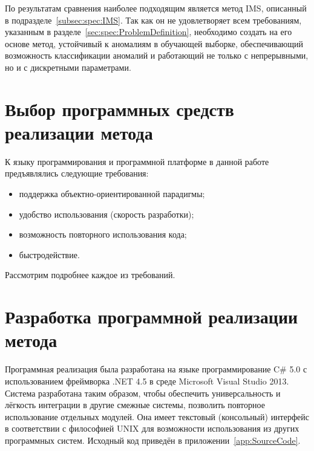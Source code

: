 По результатам сравнения наиболее подходящим является метод IMS, описанный в подразделе~\ref{subsec:spec:IMS}. Так как он не удовлетворяет всем требованиям, указанным в разделе~\ref{sec:spec:ProblemDefinition}, необходимо создать на его основе метод, устойчивый к аномалиям в обучающей выборке, обеспечивающий возможность классификации аномалий и работающий не только с непрерывными, но и с дискретными параметрами.



\section{Выбор программных средств реализации метода}

К языку программирования и программной платформе в данной работе предъявлялись следующие требования:
\begin{itemize}
	\item поддержка объектно-ориентированной парадигмы;
	\item удобство использования (скорость разработки);
	\item возможность повторного использования кода;
	\item быстродействие.
\end{itemize}

Рассмотрим подробнее каждое из требований.







\section{Разработка программной реализации метода}
Программная реализация была разработана на языке программирование C\# 5.0 с использованием фреймворка .NET 4.5 в среде Microsoft Visual Studio 2013. Система разработана таким образом, чтобы обеспечить универсальность и лёгкость интеграции в другие смежные системы, позволить повторное использование отдельных модулей. Она имеет текстовый (консольный) интерфейс в соответствии с философией UNIX для возможности использования из других программных систем. Исходный код приведён в приложении~\ref{app:SourceCode}.






